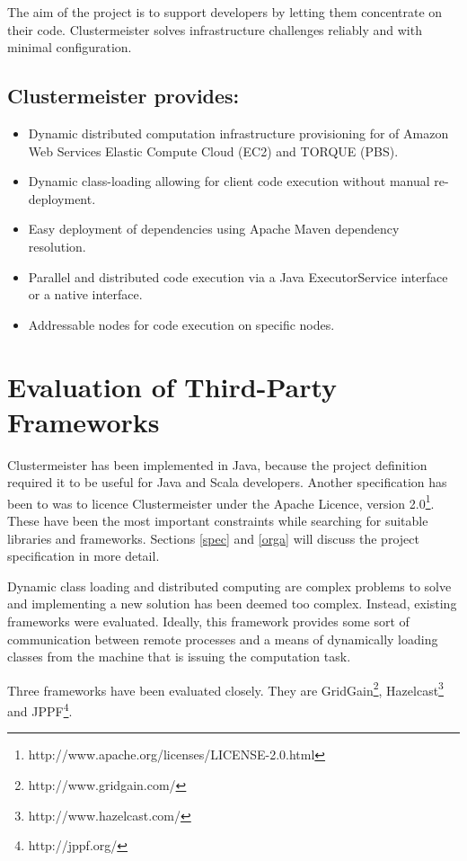 \documentclass[english]{uzhpub}
\begin{document}
The aim of the project is to support developers by letting them concentrate on their code. Clustermeister solves infrastructure challenges reliably and with minimal configuration.

\subsection*{Clustermeister provides:}
\begin{itemize}
\item Dynamic distributed computation infrastructure provisioning for of Amazon Web Services Elastic Compute Cloud (EC2) and TORQUE (PBS).
\item Dynamic class-loading allowing for client code execution without manual re-deployment.
\item Easy deployment of dependencies using Apache Maven dependency resolution.
\item Parallel and distributed code execution via a Java ExecutorService interface or a native interface.
\item Addressable nodes for code execution on specific nodes.
\end{itemize}

\section{Evaluation of Third-Party Frameworks}

Clustermeister has been implemented in Java, because the project definition required it to be useful for Java and Scala developers. Another specification has been to was to licence Clustermeister under the Apache Licence, version 2.0\footnote{http://www.apache.org/licenses/LICENSE-2.0.html}. These have been the most important constraints while searching for suitable libraries and frameworks. Sections \ref{spec} and \ref{orga} will discuss the project specification in more detail.

Dynamic class loading and distributed computing are complex problems to solve and implementing a new solution has been deemed too complex. Instead, existing frameworks were evaluated. Ideally, this framework provides some sort of communication between remote processes and a means of dynamically loading classes from the machine that is issuing the computation task.

Three frameworks have been evaluated closely. They are 
GridGain\footnote{http://www.gridgain.com/}, Hazelcast\footnote{http://www.hazelcast.com/} and JPPF\footnote{http://jppf.org/}.
\end{document}
